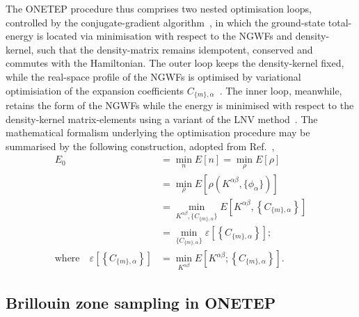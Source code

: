 {
The \textsc{ONETEP} procedure 
thus comprises two nested optimisation loops, 
controlled by the conjugate-gradient algorithm~\cite{hestenes1952methods}, 
in which the ground-state total-energy 
is located via minimisation with respect to 
the NGWFs and density-kernel, 
such that the density-matrix 
remains idempotent, conserved 
and commutes with the Hamiltonian.
%
The outer loop keeps 
the density-kernel fixed, 
while the real-space profile  
of the NGWFs is optimised 
by variational optimisiation 
of the expansion coefficients 
$C_{\{m\},\alpha}$~\cite{skylaris2005introducing,
PSSB:PSSB200541457,HINE20091041,0953-8984-20-6-064209}.
%
The inner loop, meanwhile, 
retains the form of the NGWFs 
while the energy is minimised 
with respect to the 
density-kernel matrix-elements 
using a variant of the LNV method~\cite{0953-8984-20-29-294207}.
%
The mathematical formalism 
underlying the optimisation procedure 
may be summarised by the following 
construction, adopted from Ref.~\cite{o2011optimised}, 
%
\begin{align}
E_0&=\min_n E[n] = \min_\rho E[\rho] \nonumber\\[0.25em]
&=\min_\rho E\left[\rho(K^{\alpha\beta},\{\phi_\alpha\})\right] \nonumber \\[0.25em]
&=\min_{K^{\alpha\beta},\{C_{\{m\},\alpha}\}}
		E\left[K^{\alpha\beta},\left\{C_{\{m\},\alpha}\right\}\right] \nonumber \\[0.25em]
&=\min_{\{C_{\{m\},\alpha}\}}
		\varepsilon \left[\left\{C_{\{m\},\alpha}\right\}\right]; \nonumber \\[0.25em]
\mbox{where}\quad  
\varepsilon \left[\left\{C_{\{m\},\alpha}\right\}\right]
&=\min_{K^{\alpha\beta}}
		E\left[K^{\alpha\beta}; \left\{C_{\{m\},\alpha}\right\}\right].
\end{align}}
\vspace{-1em}


\subsection{Brillouin zone sampling in {\sc ONETEP}}
\label{sec:bz_sampling}

